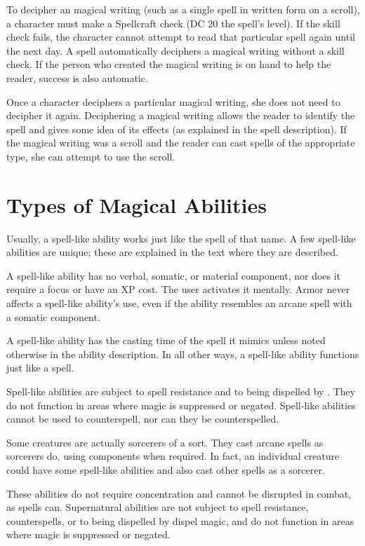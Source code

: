 To decipher an magical writing (such as a single spell in written form on a scroll), a character must make a Spellcraft check (DC 20 \add the spell's level). If the skill check fails, the character cannot attempt to read that particular spell again until the next day. A  spell automatically deciphers a magical writing without a skill check. If the person who created the magical writing is on hand to help the reader, success is also automatic.

Once a character deciphers a particular magical writing, she does not need to decipher it again. Deciphering a magical writing allows the reader to identify the spell and gives some idea of its effects (as explained in the spell description). If the magical writing was a scroll and the reader can cast spells of the appropriate type, she can attempt to use
the scroll.

\section{Types of Magical Abilities}

 Usually, a spell-like ability works just like the spell of that name. A few spell-like abilities are unique; these are explained in the text where they are described.

A spell-like ability has no verbal, somatic, or material component, nor does it require a focus or have an XP cost. The user activates it mentally. Armor never affects a spell-like ability's use, even if the ability resembles an arcane spell with a somatic component.

A spell-like ability has the casting time of the spell it mimics unless noted otherwise in the ability description. In all other ways, a spell-like ability functions just like a spell.

Spell-like abilities are subject to spell resistance and to being dispelled by . They do not function in areas where magic is suppressed or negated. Spell-like abilities cannot be used to counterspell, nor can they be counterspelled.

Some creatures are actually sorcerers of a sort. They cast arcane spells as sorcerers do, using components when required. In fact, an individual creature could have some spell-like abilities and also cast other spells as a sorcerer.

 These abilities do not require concentration and cannot be disrupted in combat, as spells can. Supernatural abilities are not subject to spell resistance, counterspells, or to being dispelled by dispel magic, and do not function in areas where magic is suppressed or negated.

